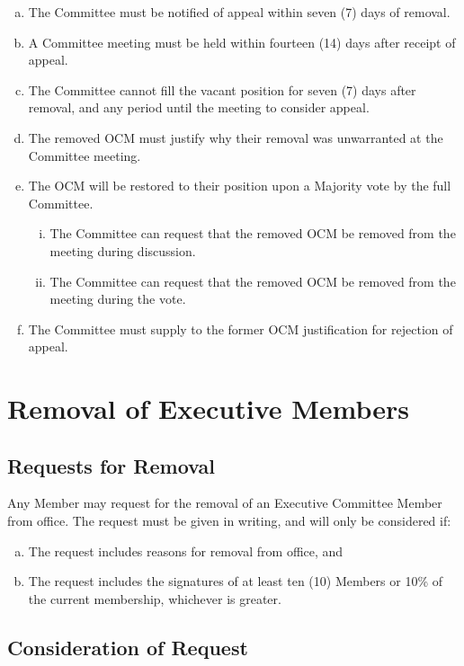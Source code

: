 \documentclass[a4paper,12pt]{article}
\begin{document}
\begin{enumerate}[a)]
	\item The Committee must be notified of appeal within seven (7) days of removal.
	\item A Committee meeting must be held within fourteen (14) days after receipt of appeal.
	\item The Committee cannot fill the vacant position for seven (7) days after removal, and any period until the meeting to consider appeal.
	\item The removed OCM must justify why their removal was unwarranted at the Committee meeting.
	\item The OCM will be restored to their position upon a Majority vote by the full Committee.
	\begin{enumerate}[i)]
		\item The Committee can request that the removed OCM be removed from the meeting during discussion.
		\item The Committee can request that the removed OCM be removed from the meeting during the vote.
	\end{enumerate}
	\item The Committee must supply to the former OCM justification for rejection of appeal.
\end{enumerate}

\section{Removal of Executive Members}

\subsection{Requests for Removal}

Any Member may request for the removal of an Executive Committee Member from office. The request must be given in writing, and will only be considered if:

\begin{enumerate}[a)]
	\item The request includes reasons for removal from office, and
	\item The request includes the signatures of at least ten (10) Members or 10\% of the current membership, whichever is greater.
\end{enumerate}

\subsection{Consideration of Request}
\end{document}
